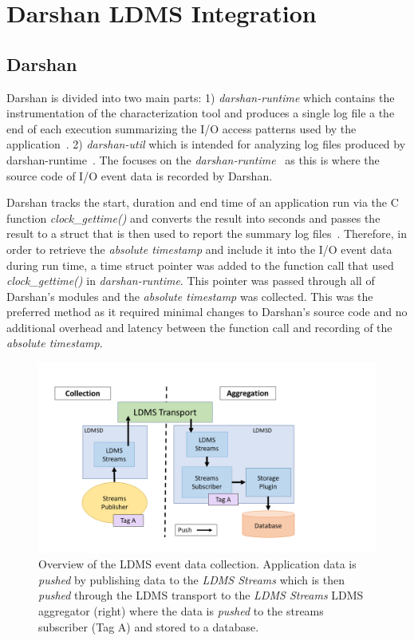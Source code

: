 \documentclass[conference]{IEEEtran}
\begin{document}
\section{Darshan LDMS Integration}
\subsection{Darshan}
Darshan is divided into two main parts: 1) \emph{darshan-runtime} which contains the instrumentation of the characterization tool and produces a single log file a the end of each execution summarizing the I/O access patterns used by the application~\cite{darshan-doc}. 2) \emph{darshan-util} which is intended for analyzing log files produced by darshan-runtime~\cite{darshan-doc}. The \Darshan focuses on the \emph{darshan-runtime}~\cite{darshan-runtime} as this is where the source code of I/O event data is recorded by Darshan.

Darshan tracks the start, duration and end time of an application run via the C function \emph{clock\_gettime()} and converts the result into seconds and passes the result to a struct that is then used to report the summary log files~\cite{darshangithub}. Therefore, in order to retrieve the \emph{absolute timestamp} and include it into the I/O event data during run time, a time struct pointer was added to the function call that used \emph{clock\_gettime()} in \emph{darshan-runtime}. This pointer was passed through all of Darshan's modules and the \emph{absolute timestamp} was collected. This was the preferred method as it required minimal changes to Darshan's source code and no additional overhead and latency between the function call and recording of the \emph{absolute timestamp}. 

\begin{figure}
  \centering
    \includegraphics[width=1.2\linewidth]{figs/ldms-overview.png}
\caption{Overview of the LDMS event data collection. Application data is \emph{pushed} by publishing data to the \emph{LDMS Streams} which is then \emph{pushed} through the LDMS transport to the \emph{LDMS Streams} LDMS aggregator (right) where the data is \emph{pushed} to the streams subscriber (Tag A) and stored to a database.}
\label{f:CSV Header and Output}
\end{figure}
\end{document}
